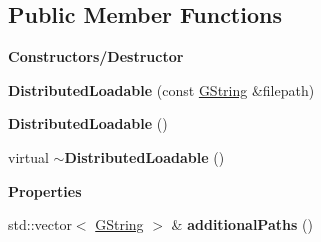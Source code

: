 \subsection*{Public Member Functions}
\begin{Indent}\textbf{ Constructors/\+Destructor}\par
\begin{DoxyCompactItemize}
\item 
\mbox{\label{classrev_1_1_distributed_loadable_a2d1a80416e4054333645423f429faa61}} 
{\bfseries Distributed\+Loadable} (const \mbox{\hyperlink{classrev_1_1_g_string}{G\+String}} \&filepath)
\item 
\mbox{\label{classrev_1_1_distributed_loadable_a3af98c470f08888b34d0157076177d3b}} 
{\bfseries Distributed\+Loadable} ()
\item 
\mbox{\label{classrev_1_1_distributed_loadable_a0a900e9b00114313b7524d200b20f547}} 
virtual {\bfseries $\sim$\+Distributed\+Loadable} ()
\end{DoxyCompactItemize}
\end{Indent}
\begin{Indent}\textbf{ Properties}\par
\begin{DoxyCompactItemize}
\item 
\mbox{\label{classrev_1_1_distributed_loadable_a821e7f2973a7e9257a6c957c98bf0f4e}} 
std\+::vector$<$ \mbox{\hyperlink{classrev_1_1_g_string}{G\+String}} $>$ \& {\bfseries additional\+Paths} ()
\end{DoxyCompactItemize}
\end{Indent}
